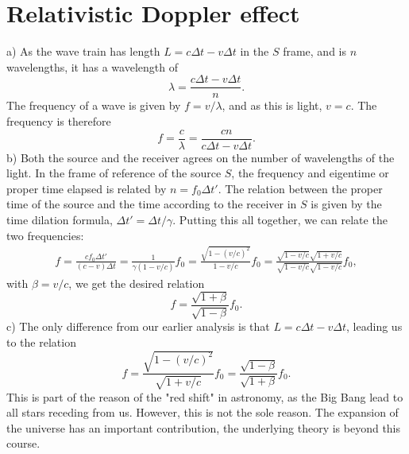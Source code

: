 \documentclass{article}
\begin{document}
    \section{Relativistic Doppler effect}
    a) As the wave train has length $L = c \Delta t - v \Delta t$ in the $S$ frame, and is $n$ wavelengths, it has a wavelength of 
    \begin{equation*}
        \lambda = \frac{c \Delta t - v \Delta t}{n}.
    \end{equation*}
    The frequency of a wave is given by $f = v / \lambda$, and as this is light, $v = c$. The frequency is therefore
    \begin{equation*}
        f = \frac{c}{\lambda} = \frac{cn}{c \Delta t - v \Delta t}.
    \end{equation*}
    b) Both the source and the receiver agrees on the number of wavelengths of the light. In the frame of reference of the source $S$, the frequency and eigentime or proper time elapsed is related by $n = f_0 \Delta t'$. The relation between the proper time of the source and the time according to the receiver in $S$ is given by the time dilation formula, $\Delta t' = \Delta t / \gamma$. Putting this all together, we can relate the two frequencies:
    \begin{align*}
        f = \frac{c f_0 \Delta t'}{(c - v)\Delta t} = \frac{1}{\gamma(1 - v/c)} f_0 = \frac{\sqrt{1 - (v/c)^2}}{1 - v/c} f_0 = \frac{\sqrt{1 - v/c}\sqrt{1 + v/c}}{\sqrt{1 - v/c}\sqrt{1 - v/c}}f_0,
    \end{align*} 
    with $\beta = v/c$, we get the desired relation
    \begin{equation*}
        f = \frac{\sqrt{1 + \beta}}{\sqrt{1 - \beta}}f_0.
    \end{equation*}
    c) The only difference from our earlier analysis is that $L = c \Delta t - v \Delta t$, leading us to the relation
    \begin{equation*}
        f = \frac{\sqrt{1 - (v/c)^2}}{\sqrt{1 + v/c}}f_0 = \frac{\sqrt{1 - \beta}}{\sqrt{1 + \beta}}f_0.
    \end{equation*}
    This is part of the reason of the "red shift" in astronomy, as the Big Bang lead to all stars receding from us. However, this is not the sole reason. The expansion of the universe has an important contribution, the underlying theory is beyond this course.
\end{document}

